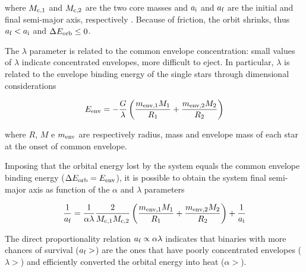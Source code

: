 \documentclass[a4paper,titlepage]{book}     	%
\begin{document}
where $M_\textup{c,1}$ and $M_\textup{c,2}$ are the two core masses and $a_\textup{i}$ and $a_\textup{f}$ are the initial and final semi-major axis, respectively . Because of friction, the orbit shrinks, thus $a_\textup{f} < a_\textup{i}$ and $\Delta E_\textup{orb} \leq 0$.

The $\lambda$ parameter is related to the common envelope concentration: small values of $\lambda$ indicate concentrated envelopes, more difficult to eject. In particular, $\lambda$ is related to the envelope binding energy of the single stars through dimensional considerations

\begin{equation}\label{eq:EenvCElambda}
E_\textup{env} = - \frac{G}{\lambda} \left(\frac{m_\textup{env,1} M_1}{R_1}+ \frac{m_\textup{env,2} M_2}{R_2}\right)
\end{equation}

where $R$, $M$ e $m_\textup{env}$ are respectively radius, mass and envelope mass of each star at the onset of common envelope.

Imposing that the orbital energy lost by the system equals the common envelope binding energy ($\Delta E_\textup{orb} = E_\textup{env}$), it is possible to obtain the system final semi-major axis as function of the $\alpha$ and $\lambda$ parameters

\begin{equation}\label{eqn:a_ce}
\frac{1}{a_\textup{f}} = \frac{1}{\alpha \lambda} \frac{2}{M_\textup{c,1} M_\textup{c,2}} \left(\frac{m_\textup{env,1} M_1}{R_1}+ \frac{m_\textup{env,2} M_2}{R_2}\right) + \frac{1}{a_\textup{i}}
\end{equation}

The direct proportionality relation $a_\textup{f} \propto \alpha\lambda$ indicates that binaries with more chances of survival ($a_{\rm f} >$) are the ones that have poorly concentrated envelopes ($\lambda >$) and efficiently converted the orbital energy into heat ($\alpha >$). \\
\end{document}

